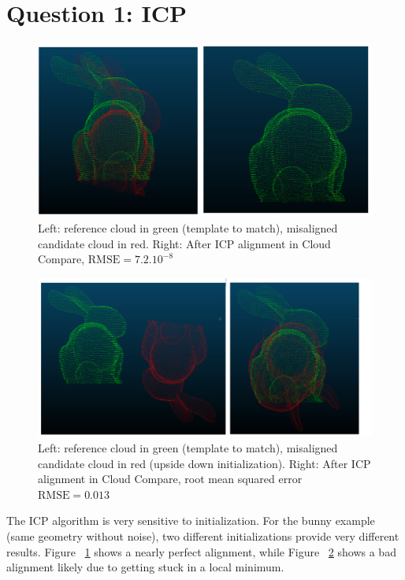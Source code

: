 \documentclass[a4paper]{article}
\begin{document}





\section*{Question 1: ICP}
\begin{figure}[ht]
    \centering
    \includegraphics[width=0.8\linewidth]{figures/bunny_icp_cloud_compare.png}
    \caption{Left: reference cloud in green (template to match), misaligned candidate cloud in red. Right: After ICP alignment in Cloud Compare, $\text{RMSE}=7.2. 10^{-8}$}
    \label{fig:CC_alignment_ok}
\end{figure}

\begin{figure}[ht]
    \centering
    \includegraphics[width=0.8\linewidth]{figures/bunny_icp_upside_down_cloud_compare.png}
    \caption{Left: reference cloud in green (template to match), misaligned candidate cloud in red (upside down initialization). 
    Right: After ICP alignment in Cloud Compare, root mean squared error $\text{RMSE}=0.013$}
    \label{fig:CC_alignment_nok}
\end{figure}

The ICP algorithm is very sensitive to initialization. For the bunny example (same geometry without noise), two different initializations provide very different results.
Figure ~\ref{fig:CC_alignment_ok} shows a nearly perfect alignment, while Figure ~\ref{fig:CC_alignment_nok} shows a bad alignment likely due to getting stuck in a local minimum.
\end{document}
